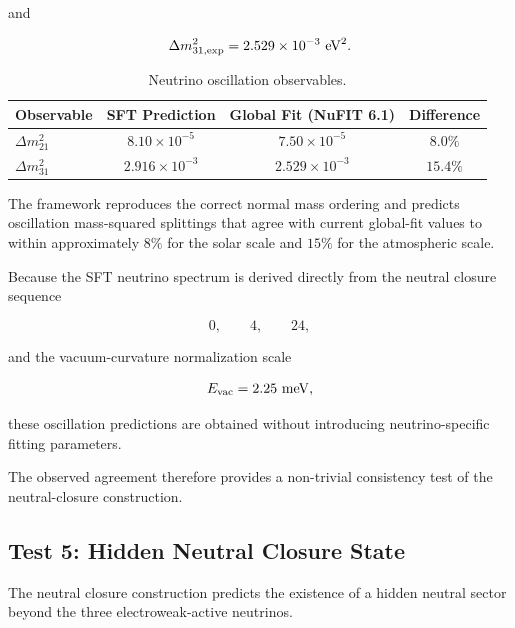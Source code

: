 \documentclass[11pt]{article}
\theoremstyle{definition}
\theoremstyle{remark}
\begin{document}
and

\begin{equation}
\Delta m_{31,\rm exp}^{2}
=
2.529\times10^{-3}
~{\rm eV}^{2}.
\end{equation}

\begin{table}[H]
\centering
\caption{Neutrino oscillation observables.}
\begin{tabular}{lccc}
\toprule
Observable &
SFT Prediction &
Global Fit (NuFIT 6.1) &
Difference \\
\midrule
$\Delta m_{21}^{2}$ &
$8.10\times10^{-5}$ &
$7.50\times10^{-5}$ &
$8.0\%$ \\
$\Delta m_{31}^{2}$ &
$2.916\times10^{-3}$ &
$2.529\times10^{-3}$ &
$15.4\%$ \\
\bottomrule
\end{tabular}
\end{table}

The framework reproduces the correct normal mass ordering and
predicts oscillation mass-squared splittings that agree with
current global-fit values to within approximately \(8\%\) for
the solar scale and \(15\%\) for the atmospheric scale.

Because the SFT neutrino spectrum is derived directly from the
neutral closure sequence

\begin{equation}
0,
\qquad
4,
\qquad
24,
\end{equation}

and the vacuum-curvature normalization scale

\begin{equation}
E_{\rm vac}
=
2.25~{\rm meV},
\end{equation}

these oscillation predictions are obtained without introducing
neutrino-specific fitting parameters.

The observed agreement therefore provides a non-trivial
consistency test of the neutral-closure construction.


\subsection{Test 5: Hidden Neutral Closure State}

The neutral closure construction predicts the existence of a
hidden neutral sector beyond the three electroweak-active
neutrinos.
\end{document}
